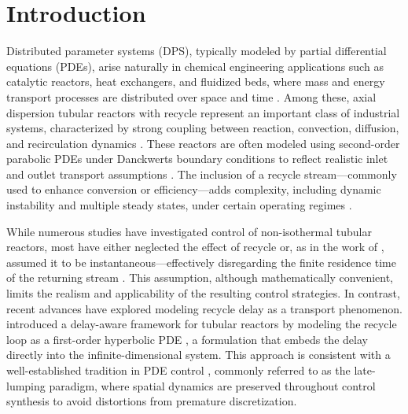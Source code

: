 \section{Introduction}

Distributed parameter systems (DPS), typically modeled by partial differential equations (PDEs), arise naturally in chemical engineering applications such as catalytic reactors, heat exchangers, and fluidized beds, where mass and energy transport processes are distributed over space and time \autocite{ray1981advanced, davison1976robust,Curtain2020Introduction}. Among these, axial dispersion tubular reactors with recycle represent an important class of industrial systems, characterized by strong coupling between reaction, convection, diffusion, and recirculation dynamics \autocite{jensen1982bifurcation, Ali2015Review, Hlavacˇek1970Modeling,Hlavacˇek1970Modelinga,Cohen1974Tubular,Georgakis1977Studies}. These reactors are often modeled using second-order parabolic PDEs under Danckwerts boundary conditions to reflect realistic inlet and outlet transport assumptions \autocite{Danckwerts1953Continuous}. The inclusion of a recycle stream—commonly used to enhance conversion or efficiency—adds complexity, including dynamic instability and multiple steady states, under certain operating regimes \autocite{Luss1967Stability,Bildea2004Design}. 

While numerous studies have investigated control of non-isothermal tubular reactors, most have either neglected the effect of recycle or, as in the work of , assumed it to be instantaneous—effectively disregarding the finite residence time of the returning stream \autocite{Khatibi2021Model}. This assumption, although mathematically convenient, limits the realism and applicability of the resulting control strategies. In contrast, recent advances have explored modeling recycle delay as a transport phenomenon.  introduced a delay-aware framework for tubular reactors by modeling the recycle loop as a first-order hyperbolic PDE \autocite{Moadeli2025Optimal}, a formulation that embeds the delay directly into the infinite-dimensional system. This approach is consistent with a well-established tradition in PDE control \autocite{Christofides1997Finite,Armaou2002Dynamic, aksikas2017optimal,balas1979feedback,Curtain1982Finite}, commonly referred to as the late-lumping paradigm, where spatial dynamics are preserved throughout control synthesis to avoid distortions from premature discretization.

